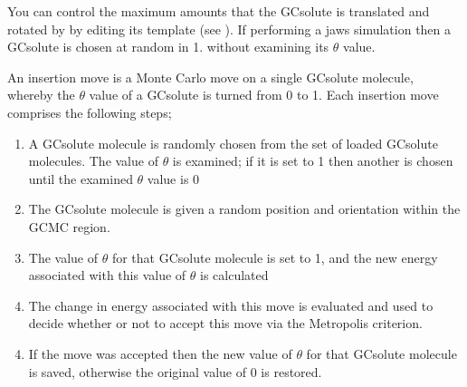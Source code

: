 \documentclass[letterpaper,10pt,english]{sphinxmanual}
\begin{document}
You can control the maximum amounts that the GCsolute is translated and rotated by by editing its template (see {\hyperref[\detokenize{protoms:temref}]{}}). If performing a jaws simulation then a GCsolute is chosen at random in 1. without examining its \(\theta\) value.

\ignorespaces 
{}

An insertion move is a Monte Carlo move on a single GCsolute molecule, whereby the \(\theta\) value of a GCsolute is turned from 0 to 1. Each insertion move comprises the following steps;
\begin{enumerate}
\item {} 
A GCsolute molecule is randomly chosen from the set of loaded GCsolute molecules. The value of \(\theta\) is examined; if it is set to 1 then another is chosen until the examined \(\theta\) value is 0

\item {} 
The GCsolute molecule is given a random position and orientation within the GCMC region.

\item {} 
The value of \(\theta\) for that GCsolute molecule is set to 1, and the new energy associated with this value of \(\theta\) is calculated

\item {} 
The change in energy associated with this move is evaluated and used to decide whether or not to accept this move via the Metropolis criterion.

\end{enumerate}
\begin{enumerate}
\setcounter{enumi}{3}
\item {} 
If the move was accepted then the new value of \(\theta\) for that GCsolute molecule is saved, otherwise the original value of 0 is restored.

\end{enumerate}

\ignorespaces 
{}
\end{document}
